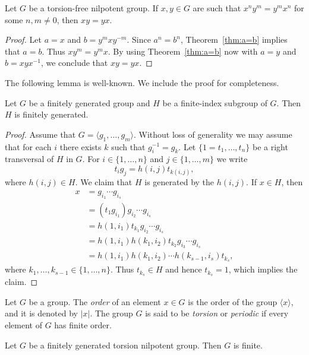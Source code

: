 \begin{corollary}
	Let $G$ be a torsion-free nilpotent group. If $x,y\in G$ are such that 
	$x^ny^m=y^mx^n$ for some $n,m\ne 0$, then $xy=yx$.
\end{corollary}

\begin{proof}
	Let $a=x$ and $b=y^mxy^{-m}$. Since $a^n=b^n$, Theorem~\ref{thm:a=b} implies that $a=b$. Thus $xy^m=y^mx$. 
	By using Theorem~\ref{thm:a=b} now with $a=y$ and $b=xyx^{-1}$, we conclude that 
	$xy=yx$. 
\end{proof}

The following lemma is well-known. We include the proof for completeness. 

\begin{lemma}
	\label{lem:fg}
	Let $G$ be a finitely generated group and $H$ be a finite-index subgroup of $G$. 
	Then $H$ is finitely generated. 
\end{lemma}

\begin{proof}
	Assume that $G=\langle g_1,\dots,g_m\rangle$. Without loss of generality we may assume that 
	for each $i$ there exists $k$ such that $g_i^{-1}=g_k$. 
	Let $\{1=t_1,\dots,t_n\}$ be a right transversal of $H$ in $G$. For 
	$i\in\{1,\dots,n\}$ and 
	$j\in\{1,\dots,m\}$ we write 
	\[
		t_ig_j=h(i,j)t_{k(i,j)},
	\]
	where $h(i,j)\in H$.
	We claim that $H$ is generated by the $h(i,j)$. If $x\in H$, then 
	\begin{align*}
	x &=g_{i_1}\cdots g_{i_s}\\
	&= (t_1g_{i_1})g_{i_2}\cdots g_{i_s}\\
	&= h(1,i_1)t_{k_1}g_{i_2}\cdots g_{i_s}\\
	&= h(1,i_1)h(k_1,i_2)t_{k_2}g_{i_3}\cdots g_{i_s}\\
	&= h(1,i_1)h(k_1,i_2)\cdots h(k_{s-1},i_s)t_{k_s},
	\end{align*}
	where $k_1,\dots,k_{s-1}\in\{1,\dots,n\}$. Thus $t_{k_s}\in H$ and hence 
	$t_{k_s}=1$, which implies the claim.  
\end{proof}

Let $G$ be a group. The {\em order} of an element $x\in G$ is the order of the group $\langle x\rangle$, and it is denoted by $|x|$.  The group $G$ is said to be {\em torsion} or {\em periodic} if every element of $G$ has finite order.


\begin{theorem}
	\label{thm:T(G)finito}
	Let $G$ be a finitely generated torsion nilpotent group. Then
	$G$ is finite.  	
\end{theorem}

